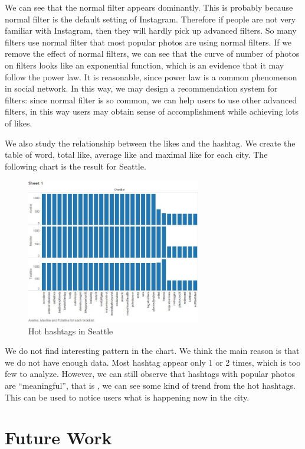 \documentclass[conference]{acmsiggraph}
\begin{document}
We can see that the normal filter appears dominantly. This is probably because normal filter is the default setting of Instagram. Therefore if people are not very familiar with Instagram, then they will hardly pick up advanced filters. So many filters use normal filter that most popular photos are using normal filters. If we remove the effect of normal filters, we can see that the curve of  number of photos on filters looks like an exponential function, which is an evidence that it may  follow the power law. It is reasonable, since power law is a common phenomenon in social network.
In this way, we may design a recommendation system for filters:
since normal filter is so common,
we can help users to use other advanced filters,
in this way users may obtain sense of accomplishment while achieving lots of likes.


We also study the relationship between the likes and the hashtag. We create the table of word, total like, average like and maximal like for each city. The following chart is the result for Seattle.
\begin{figure}[ht]
  \centering
  \includegraphics[width=3in]{images/sample_Seattle_like_word}
  \caption{Hot hashtags in Seattle}
\end{figure}
We do not find interesting pattern in the chart. We think the main reason is that we do not have enough data. Most hashtag appear only 1 or 2 times, which is too few to analyze. However, we can still observe that hashtags with popular photos are “meaningful”, that is , we can see some kind of trend from the hot hashtags. This can be used to notice users what is happening now in the city.



\section{Future Work}
\end{document}
